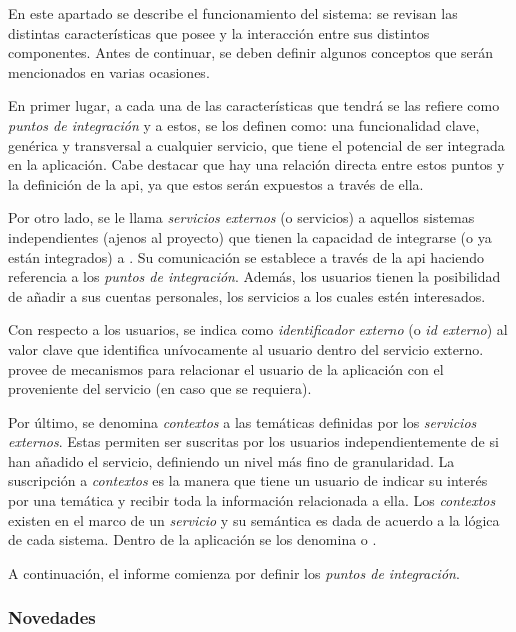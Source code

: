 En este apartado se describe el funcionamiento del sistema: se revisan las distintas características que posee y la interacción entre sus distintos componentes.
Antes de continuar, se deben definir algunos conceptos que serán mencionados en varias ocasiones. 

En primer lugar, a cada una de las características que tendrá \nombreApp{} se las refiere como \textit{puntos de integración} y a estos, se los definen como: una funcionalidad clave, genérica y transversal a cualquier servicio, que tiene el potencial de ser integrada en la aplicación.
Cabe destacar que hay una relación directa entre estos puntos y la definición de la \gls{api}, ya que estos serán expuestos a través de ella. 

Por otro lado, se le llama \textit{servicios externos} (o servicios) a aquellos sistemas independientes (ajenos al proyecto) que tienen la capacidad de integrarse (o ya están integrados) a \nombreApp{}. Su comunicación se establece a través de la \gls{api} haciendo referencia a los \textit{puntos de integración}. Además, los usuarios tienen la posibilidad de añadir a sus cuentas personales, los servicios a los cuales estén interesados. 

Con respecto a los usuarios, se indica como \textit{identificador externo} (o \textit{id externo}) al valor clave que identifica unívocamente al usuario dentro del servicio externo. \nombreApp{} provee de mecanismos para relacionar el usuario de la aplicación con el proveniente del servicio (en caso que se requiera).

Por último, se denomina \textit{contextos} a las temáticas definidas por los \textit{servicios externos}. Estas permiten ser suscritas por los usuarios independientemente de si han añadido el servicio, definiendo un nivel más fino de granularidad. La suscripción a \textit{contextos} es la manera que tiene un usuario de indicar su interés por una temática y recibir toda la información relacionada a ella.
Los \textit{contextos} existen en el marco de un \textit{servicio} y su semántica es dada de acuerdo a la lógica de cada sistema. Dentro de la aplicación se los denomina  o .

A continuación, el informe comienza por definir los \textit{puntos de integración}.

\subsubsection{Novedades}
\label{funcionalidad_noticias}


